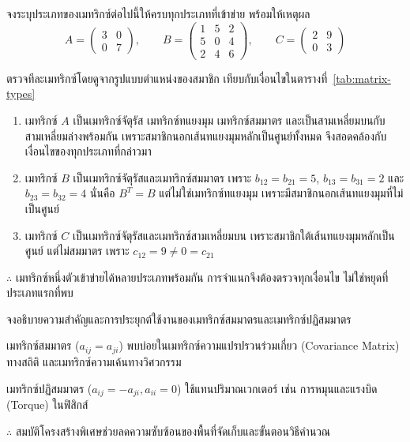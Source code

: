 \begin{ex}[การจำแนกประเภทของเมทริกซ์]
\label{ex:classify-matrix-types}
จงระบุประเภทของเมทริกซ์ต่อไปนี้ให้ครบทุกประเภทที่เข้าข่าย พร้อมให้เหตุผล
\[
A = \begin{pmatrix} 3 & 0 \\ 0 & 7 \end{pmatrix}, \qquad
B = \begin{pmatrix} 1 & 5 & 2 \\ 5 & 0 & 4 \\ 2 & 4 & 6 \end{pmatrix}, \qquad
C = \begin{pmatrix} 2 & 9 \\ 0 & 3 \end{pmatrix}
\]
\end{ex}
\begin{solution}
ตรวจทีละเมทริกซ์โดยดูจากรูปแบบตำแหน่งของสมาชิก เทียบกับเงื่อนไขในตารางที่~\ref{tab:matrix-types}
\begin{enumerate}
    \item เมทริกซ์ $A$ เป็นเมทริกซ์จัตุรัส เมทริกซ์ทแยงมุม เมทริกซ์สมมาตร และเป็นสามเหลี่ยมบนกับสามเหลี่ยมล่างพร้อมกัน เพราะสมาชิกนอกเส้นทแยงมุมหลักเป็นศูนย์ทั้งหมด จึงสอดคล้องกับเงื่อนไขของทุกประเภทที่กล่าวมา
    \item เมทริกซ์ $B$ เป็นเมทริกซ์จัตุรัสและเมทริกซ์สมมาตร เพราะ $b_{12}=b_{21}=5$, $b_{13}=b_{31}=2$ และ $b_{23}=b_{32}=4$ นั่นคือ $B^T = B$ แต่ไม่ใช่เมทริกซ์ทแยงมุม เพราะมีสมาชิกนอกเส้นทแยงมุมที่ไม่เป็นศูนย์
    \item เมทริกซ์ $C$ เป็นเมทริกซ์จัตุรัสและเมทริกซ์สามเหลี่ยมบน เพราะสมาชิกใต้เส้นทแยงมุมหลักเป็นศูนย์ แต่ไม่สมมาตร เพราะ $c_{12}=9 \neq 0 = c_{21}$
\end{enumerate}
$\therefore$ เมทริกซ์หนึ่งตัวเข้าข่ายได้หลายประเภทพร้อมกัน การจำแนกจึงต้องตรวจทุกเงื่อนไข ไม่ใช่หยุดที่ประเภทแรกที่พบ \solhere
\end{solution}

\begin{ex}
\label{ex:symmetric-application}
จงอธิบายความสำคัญและการประยุกต์ใช้งานของเมทริกซ์สมมาตรและเมทริกซ์ปฏิสมมาตร
\end{ex}
\begin{solution}
เมทริกซ์สมมาตร ($a_{ij} = a_{ji}$) พบบ่อยในเมทริกซ์ความแปรปรวนร่วมเกี่ยว (Covariance Matrix) ทางสถิติ และเมทริกซ์ความเค้นทางวิศวกรรม

เมทริกซ์ปฏิสมมาตร ($a_{ij} = -a_{ji}, a_{ii}=0$) ใช้แทนปริมาณเวกเตอร์ เช่น การหมุนและแรงบิด (Torque) ในฟิสิกส์

$\therefore$ สมบัติโครงสร้างพิเศษช่วยลดความซับซ้อนของพื้นที่จัดเก็บและขั้นตอนวิธีคำนวณ \solhere
\end{solution}

